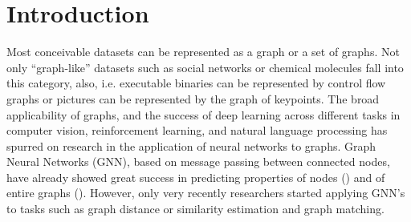 \section{Introduction}

Most conceivable datasets can be represented as a graph or a set of graphs. Not only “graph-like” datasets such as social networks or chemical molecules fall into this category, also, i.e. executable binaries can be represented by control flow graphs or pictures can be represented by the graph of keypoints. %
The broad applicability of graphs, and the success of deep learning across different tasks in computer vision, reinforcement learning, and natural language processing has spurred on research in the application of neural networks to graphs. Graph Neural Networks (GNN), based on message passing between connected nodes, have already showed great success in predicting properties of nodes (\cite{kipf2017}) and of entire graphs (\citealp{gilmer2017}). However, only very recently researchers started applying GNN's to tasks such as graph distance or similarity estimation and graph matching.

